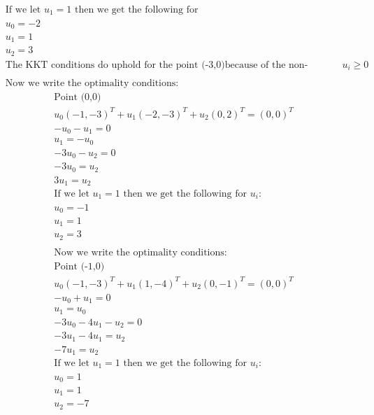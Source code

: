 \documentclass[12pt]{article}
\begin{document}
    \begin{align*}
        &\text{If we let } u_1 = 1 \text{ then we get the following for }\\
        &u_0 = -2\\
        &u_1 = 1\\
        &u_2 = 3\\
        &\text{The KKT conditions do uphold for the point (-3,0)because of the non-negative condition is not upheld } u_i \geq 0\\ \\
        &\text{Now we write the optimality conditions: }
    \end{align*}
    \begin{align*}
        &\text{Point (0,0)}\\
        & u_0 (-1,-3)^T + u_1 (-2,-3)^T + u_2 (0,2)^T = (0,0)^T\\
        &-u_0 - u_1 = 0\\
        &u_1 = -u_0\\
        &-3u_0 - u_2 = 0\\
        &-3u_0= u_2\\
        &3u_1 = u_2 \\
        &\text{If we let } u_1 = 1 \text{ then we get the following for }u_i:\\
        &u_0 = -1\\
        &u_1 = 1\\
        &u_2 = 3\\ \\
        &\text{Now we write the optimality conditions: }\\
        &\text{Point (-1,0)}\\
        & u_0 (-1,-3)^T + u_1 (1,-4)^T + u_2 (0,-1)^T = (0,0)^T\\
        &-u_0 + u_1 = 0\\
        &u_1 = u_0\\
        &-3u_0 - 4u_1 - u_2 = 0\\
        &-3u_1 - 4 u_1= u_2\\
        &-7u_1 = u_2 \\
        &\text{If we let } u_1 = 1 \text{ then we get the following for }u_i:\\
        &u_0 = 1\\
        &u_1 = 1\\
        &u_2 = -7\\
    \end{align*}
\end{document}
